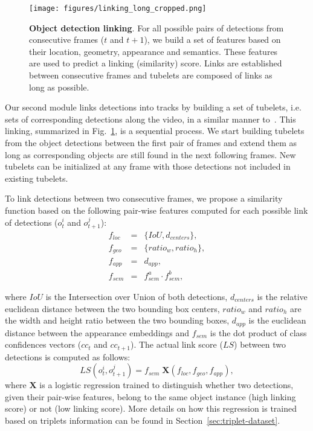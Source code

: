 \documentclass[letterpaper, 10 pt, conference]{ieeeconf}
\begin{document}
\begin{figure}[!tb]
\centering
\texttt{[image: figures/linking\_long\_cropped.png]}
\caption{
\textbf{Object detection linking}.
For all possible pairs of detections from consecutive frames ($t$ and $t+1$), we build a set of features based on their location, geometry, appearance and semantics. These features are used to predict a linking (similarity) score. Links are established between consecutive frames and tubelets are composed of links as long as possible.
}
\label{fig:linking}
\end{figure}


Our second module links detections into tracks by building a set of tubelets, i.e. sets of corresponding detections along the video, in a similar manner to~\cite{SEQ-BBOX:VISIGRAPP}. This linking, summarized in Fig.~\ref{fig:linking}, is a sequential process. 
We start building tubelets from the object detections between the first pair of frames and extend them as long as corresponding objects are still found in the next following frames. New tubelets can be initialized at any frame with those detections not included in existing tubelets.


To link detections between two consecutive frames, we propose a similarity function based on the following pair-wise features computed for each possible link of detections (\(o^{i}_{t}\) and \(o^{j}_{t+1}\)):\begin{eqnarray*}
    f_{loc}     & = & \{IoU, d_{centers} \}, \\
    f_{geo}     & = &\{ ratio_w, ratio_h \}, \\
f_{app} & = & d_{app}, \\
    f_{sem} & = & f^a_{sem} \cdot f^b_{sem}, 
\end{eqnarray*}

\noindent where $IoU$ is the Intersection over Union of both detections, $d_{centers}$ is the relative euclidean distance between the two bounding box centers, 
$ratio_w$ and $ratio_h$ are the width and height ratio between the two bounding boxes, $d_{app}$ is the euclidean distance between the appearance embeddings and $f_{sem}$ is the dot product of class confidences vectors ($cc_{t}$ and $cc_{t+1}$). 
The actual link score ($LS$) between two detections is computed as follows: \begin{equation}
\label{eq:distance-final}
LS(o^{i}_{t}, o^{j}_{t+1}) = f_{sem} \; \textbf{X}(f_{loc}, f_{geo}, f_{app}),
\end{equation}
\noindent where $\textbf{X}$ is a logistic regression trained to distinguish whether two detections, given their pair-wise features, belong to the same object instance (high linking score) or not (low linking score). More details on how this regression is trained based on triplets information can be found in Section~\ref{sec:triplet-dataset}.
\end{document}
